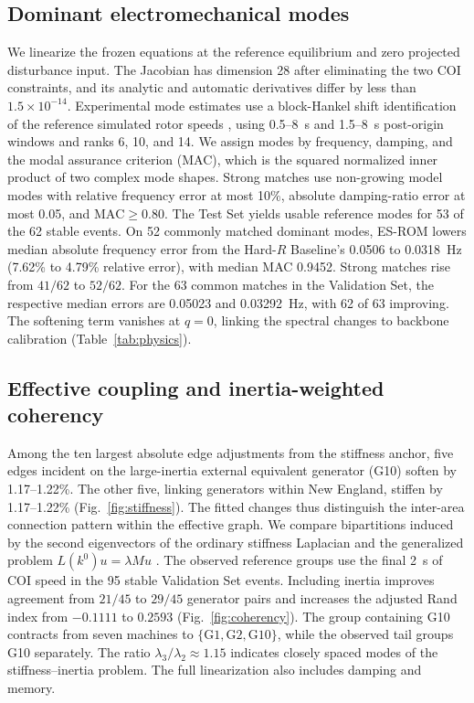 \documentclass[journal]{IEEEtran}
\newcommand{\hard}{Hard-$R$ Baseline}
\begin{document}
\subsection{Dominant electromechanical modes}
We linearize the frozen equations at the reference equilibrium and
zero projected disturbance input. The Jacobian has dimension 28 after
eliminating the two COI constraints, and its analytic and automatic
derivatives differ by less than \(1.5\times10^{-14}\). Experimental
mode estimates use a block-Hankel shift identification of the
reference simulated rotor speeds \cite{juang1985era}, using
0.5--8~s and 1.5--8~s post-origin windows and ranks 6, 10, and 14.
We assign modes by frequency, damping, and the modal assurance
criterion (MAC), which is the squared normalized inner product of two
complex mode shapes. Strong matches use non-growing model modes with
relative frequency error at most 10\%, absolute damping-ratio error
at most 0.05, and \(\mathrm{MAC}\ge0.80\).
The Test Set yields usable reference modes for 53 of the 62 stable
events. On 52 commonly matched dominant modes, ES-ROM lowers median
absolute frequency error from the \hard{}'s 0.0506 to 0.0318~Hz
(7.62\% to 4.79\% relative error), with median MAC 0.9452. Strong
matches rise from \(41/62\) to \(52/62\).
For the 63 common matches in the Validation Set, the respective median
errors are 0.05023 and 0.03292~Hz, with 62 of 63 improving.
The softening term vanishes at \(q=0\), linking the spectral changes
to backbone calibration (Table~\ref{tab:physics}).

\subsection{Effective coupling and inertia-weighted coherency}
Among the ten largest absolute edge adjustments from the stiffness
anchor, five edges incident on the large-inertia external equivalent
generator (G10) soften by 1.17--1.22\%. The other five, linking
generators within New England, stiffen by 1.17--1.22\%
(Fig.~\ref{fig:stiffness}). The fitted changes thus distinguish the
inter-area connection pattern within the effective graph.
We compare bipartitions induced by the second eigenvectors of the
ordinary stiffness Laplacian and the generalized problem
\(L(k^0)u=\lambda M u\) \cite{chow1982coherency}. The observed
reference groups use the final 2~s of COI speed in the 95 stable
Validation Set events. Including inertia improves agreement from
\(21/45\) to \(29/45\) generator pairs and increases the adjusted
Rand index from \(-0.1111\) to \(0.2593\) (Fig.~\ref{fig:coherency}).
The group containing G10 contracts from seven machines to
\(\{\mathrm{G1},\mathrm{G2},\mathrm{G10}\}\), while the observed tail
groups G10 separately. The ratio \(\lambda_3/\lambda_2\approx1.15\)
indicates closely spaced modes of the stiffness--inertia problem.
The full linearization also includes damping and memory.
\end{document}
